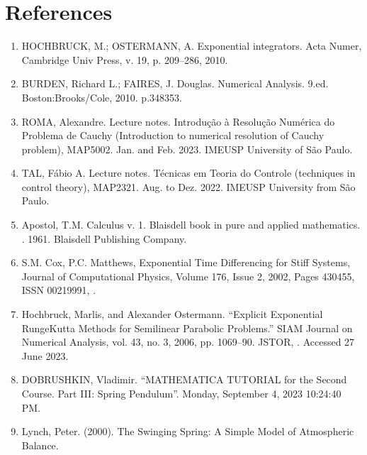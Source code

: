 \documentclass[letterpaper,10pt,english]{jupyterBook}
\begin{document}
\chapter{References}
\label{\detokenize{References:references}}\label{\detokenize{References::doc}}\begin{enumerate}
%
\item {} 
\sphinxAtStartPar
HOCHBRUCK, M.; OSTERMANN, A. Exponential integrators. Acta Numer, Cambridge Univ Press, v. 19, p. 209–286, 2010.

\item {} 
\sphinxAtStartPar
BURDEN, Richard L.; FAIRES, J. Douglas. Numerical Analysis. 9.ed. Boston:Brooks/Cole, 2010. p.348\sphinxhyphen{}353.

\item {} 
\sphinxAtStartPar
ROMA, Alexandre. Lecture notes. Introdução à Resolução Numérica do Problema de Cauchy (Introduction to numerical resolution of Cauchy problem), MAP5002. Jan. and Feb. 2023. IME\sphinxhyphen{}USP University of São Paulo.

\item {} 
\sphinxAtStartPar
TAL, Fábio A. Lecture notes. Técnicas em Teoria do Controle (techniques in control theory), MAP2321. Aug. to Dez. 2022. IME\sphinxhyphen{}USP University from São Paulo.

\item {} 
\sphinxAtStartPar
Apostol, T.M. Calculus v. 1. Blaisdell book in pure and applied mathematics. . 1961. Blaisdell Publishing Company.

\item {} 
\sphinxAtStartPar
S.M. Cox, P.C. Matthews, Exponential Time Differencing for Stiff Systems, Journal of Computational Physics, Volume 176, Issue 2, 2002, Pages 430\sphinxhyphen{}455, ISSN 0021\sphinxhyphen{}9991, .

\item {} 
\sphinxAtStartPar
Hochbruck, Marlis, and Alexander Ostermann. “Explicit Exponential Runge\sphinxhyphen{}Kutta Methods for Semilinear Parabolic Problems.” SIAM Journal on Numerical Analysis, vol. 43, no. 3, 2006, pp. 1069–90. JSTOR, . Accessed 27 June 2023.

\item {} 
\sphinxAtStartPar
DOBRUSHKIN, Vladimir. “MATHEMATICA TUTORIAL
for the Second Course. Part III: Spring Pendulum”. Monday, September 4, 2023 10:24:40 PM. 

\item {} 
\sphinxAtStartPar
Lynch, Peter. (2000). The Swinging Spring: A Simple Model of Atmospheric Balance. 

\end{enumerate}
\end{document}
